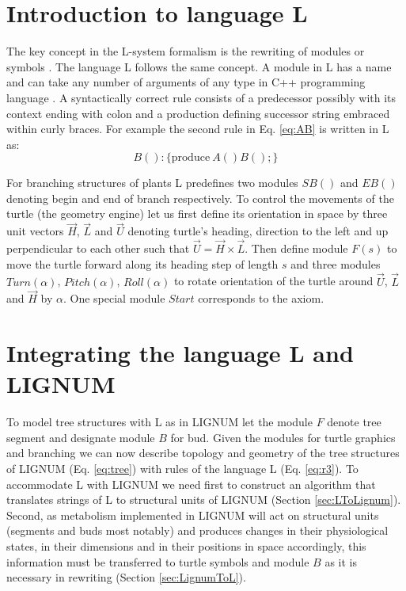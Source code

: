 \section{Introduction to language L}

The key concept in the  L-system formalism is the rewriting of modules
or symbols \citep{pp:89}.  The language  L follows the same concept. A
module in  L has a name  and can take  any number of arguments  of any
type   in   C++   programming   language   \citep{stroustrup:97}.    A
syntactically correct rule consists of a predecessor possibly with its
context ending  with colon and a production  defining successor string
embraced within curly braces.  For example the second rule in Eq.
\ref{eq:AB} is written in L as:
\begin{equation}\label{eq:r3}
 B(): \{\mathrm{produce}\ A()B();\}
\end{equation}

For branching structures of plants L predefines two modules $SB()$ and
$EB()$ denoting begin and end  of branch respectively.  To control the
movements of the turtle (the  geometry engine) let us first define its
orientation  in space by  three unit  vectors $\vec  H$, $\vec  L$ and
$\vec  U$ denoting  turtle's heading,  direction  to the  left and  up
perpendicular to each other such that $\vec U = \vec H \times \vec L$.
Then define module $F(s)$ to move the turtle forward along its heading
step of length $s$  and three modules $Turn(\alpha)$, $Pitch(\alpha)$,
$Roll(\alpha)$ to  rotate orientation of  the turtle around  $\vec U$,
$\vec  L$  and $\vec  H$  by  $\alpha$.   One special  module  $Start$
corresponds to the axiom.


\section{Integrating the language L and LIGNUM}\label{sec:pine}

To model tree structures with L as in LIGNUM let the module $F$ denote
tree segment and designate module  $B$ for bud.  Given the modules for
turtle  graphics  and  branching  we  can now  describe  topology  and
geometry of  the tree structures  of LIGNUM (Eq.   \ref{eq:tree}) with
rules of  the language  L (Eq.  \ref{eq:r3}).   To accommodate  L with
LIGNUM we need first to construct an algorithm that translates strings
of L to structural units of LIGNUM (Section \ref{sec:LToLignum}).  Second,
as  metabolism implemented  in  LIGNUM will  act  on structural  units
(segments  and  buds  most  notably)  and produces  changes  in  their
physiological states,  in their dimensions  and in their  positions in
space  accordingly, this  information  must be  transferred to  turtle
symbols  and module  $B$  as  it is  necessary  in rewriting  (Section
\ref{sec:LignumToL}).

